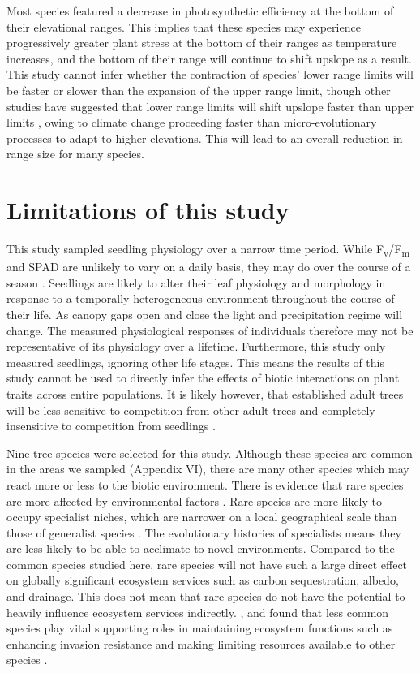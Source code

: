 \documentclass[a4paper,10pt,]{report}
\begin{document}
Most species featured a decrease in photosynthetic efficiency at the bottom of their elevational ranges. This implies that these species may experience progressively greater plant stress at the bottom of their ranges as temperature increases, and the bottom of their range will continue to shift upslope as a result. This study cannot infer whether the contraction of species' lower range limits will be faster or slower than the expansion of the upper range limit, though other studies have suggested that lower range limits will shift upslope faster than upper limits \citep{Campbell2007}, owing to climate change proceeding faster than micro-evolutionary processes to adapt to higher elevations. This will lead to an overall reduction in range size for many species.

\section{Limitations of this study}
This study sampled seedling physiology over a narrow time period. While F\textsubscript{v}/F\textsubscript{m} and SPAD are unlikely to vary on a daily basis, they may do over the course of a season \citep{Porcar-Castell2008}. Seedlings are likely to alter their leaf physiology and morphology in response to a temporally heterogeneous environment throughout the course of their life. As canopy gaps open and close the light and precipitation regime will change. The measured physiological responses of individuals therefore may not be representative of its physiology over a lifetime. Furthermore, this study only measured seedlings, ignoring other life stages. This means the results of this study cannot be used to directly infer the effects of biotic interactions on plant traits across entire populations. It is likely however, that established adult trees will be less sensitive to competition from other adult trees and completely insensitive to competition from seedlings \citep{Paine2008}. 

Nine tree species were selected for this study. Although these species are common in the areas we sampled (Appendix VI), there are many other species which may react more or less to the biotic environment. There is evidence that rare species are more affected by environmental factors \citep{Lyons2005,Mouillot2013}. Rare species are more likely to occupy specialist niches, which are narrower on a local geographical scale than those of generalist species \citep{Boulangeat2012}. The evolutionary histories of specialists means they are less likely to be able to acclimate to novel environments. Compared to the common species studied here, rare species will not have such a large direct effect on globally significant ecosystem services such as carbon sequestration, albedo, and drainage. This does not mean that rare species do not have the potential to heavily influence ecosystem services indirectly. \citet{Lyons2001}, and \citet{Lyons2005} found that less common species play vital supporting roles in maintaining ecosystem functions such as enhancing invasion resistance and making limiting resources available to other species  . 
\end{document}
